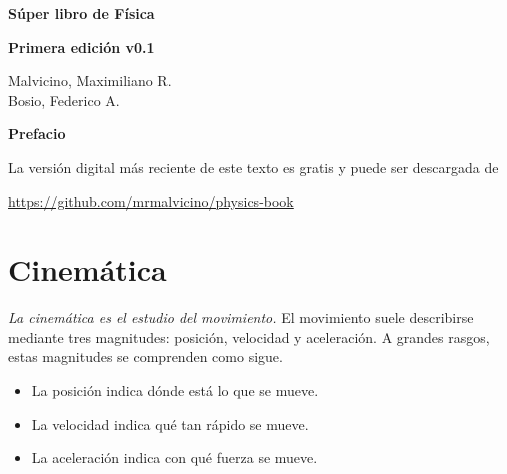 \documentclass[a5paper,12pt,twoside]{book}
\begin{document}
\pagestyle{fancy}
\fancyhf{}
\chead{\scriptsize \nouppercase\rightmark}
\cfoot{\scriptsize \thepage}
\renewcommand{\headrulewidth}{0pt}

\frontmatter


\begin{center}

    \begin{Huge}
    \textbf{Súper libro de Física}
    \end{Huge}

    \vspace{1cm}
    \textbf{Primera edición v0.1}
    \vspace{2cm}

    \begin{Large}
        Malvicino, Maximiliano R. \\
        Bosio, Federico A.
    \end{Large}

\end{center}

\clearpage
\noindent
\textbf{Prefacio}

La versión digital más reciente de este texto es gratis y puede ser descargada de
\begin{center}
    \small
    \url{https://github.com/mrmalvicino/physics-book}
\end{center}

\renewcommand{\spanishappendixname}{Anexo}
\tableofcontents

\mainmatter
{}


\chapter{Cinemática}

\emph{La cinemática es el estudio del movimiento.}
El movimiento suele describirse mediante tres magnitudes: posición, velocidad y aceleración.
A grandes rasgos, estas magnitudes se comprenden como sigue.
\begin{itemize}
    \item La posición indica dónde está lo que se mueve.
    \item La velocidad indica qué tan rápido se mueve.
    \item La aceleración indica con qué fuerza se mueve.
\end{itemize}
\end{document}
